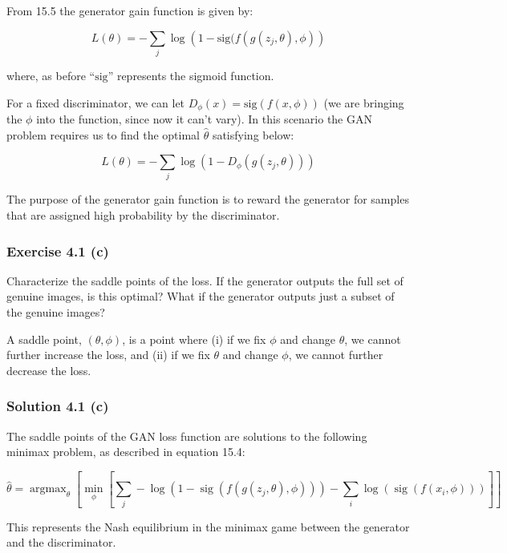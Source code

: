 \documentclass[
10pt, %
a4paper, %
oneside, %
headinclude,footinclude, %
BCOR5mm, %
]{scrartcl}
\DeclareMathOperator*{\argmax}{argmax} %
\DeclareMathOperator*{\sig}{sig}
\begin{document}
From \citet{prince2023understanding} 15.5 the generator gain function is given by:

\begin{equation*}
  L(\theta) = - \sum_j \log\left(1 - \textrm{sig}(f(g(z_j, \theta), \phi)\right)
\end{equation*}

where, as before ``$\textrm{sig}$'' represents the sigmoid function.

For a fixed discriminator, we can let $D_\phi(x) = \textrm{sig}(f(x, \phi))$ (we are bringing the $\phi$ into the function, since now it can't vary). In this scenario the GAN problem requires us to find the optimal $\hat{\theta}$ satisfying below:

\begin{equation*}
  L(\theta) = - \sum_j \log(1 - D_{\phi}(g(z_j, \theta)))
\end{equation*}

The purpose of the generator gain function is to reward the generator for samples that are assigned high probability by the discriminator.

\subsubsection*{Exercise 4.1 (c)}
Characterize the saddle points of the loss. If the generator outputs the full set of genuine images, is this optimal? What if the generator outputs just a subset of the genuine images?

A saddle point, $(\theta, \phi)$, is a point where (i) if we fix $\phi$ and change $\theta$, we cannot further increase the loss, and (ii) if we fix $\theta$ and change $\phi$, we cannot further decrease the loss.

\subsubsection*{Solution 4.1 (c)}

The saddle points of the GAN loss function are solutions to the following minimax problem, as described in \citet{prince2023understanding} equation 15.4:

\begin{equation*}
\hat{\theta} = \argmax_\theta \left[ \min_\phi \left[ \sum_j - \log(1 - \sig(f(g(z_j, \theta), \phi))) - \sum_i \log(\sig(f(x_i, \phi))) \right] \right]
\end{equation*}

This represents the Nash equilibrium in the minimax game between the generator and the discriminator.
\end{document}
